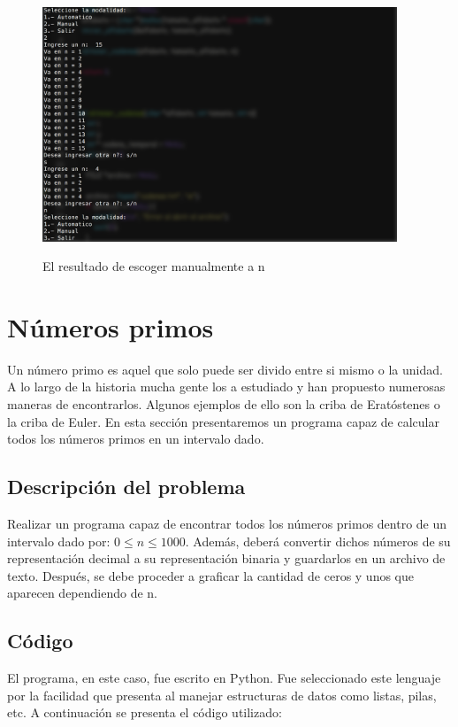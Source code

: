 \documentclass[12pt]{article}
\begin{document}
\begin{figure}[H]
\includegraphics[width=\textwidth, height=7cm]{alfabetos_manual}
\label{fig:manual_alfabeto}
\caption{El resultado de escoger manualmente a n}
\end{figure}


\newpage
\section{Números primos}
Un número primo es aquel que solo puede ser divido entre si mismo o la unidad. A lo largo de la historia mucha gente los a estudiado y han propuesto numerosas maneras de encontrarlos. Algunos ejemplos de ello son la criba de Eratóstenes o la criba de Euler. En esta sección presentaremos un programa capaz de calcular todos los números primos en un intervalo dado.

\subsection{Descripción del problema}
Realizar un programa capaz de encontrar todos los números primos dentro de un intervalo dado por: $0 \leq n \leq 1000$. Además, deberá convertir dichos números de su representación decimal a su representación binaria y guardarlos en un archivo de texto. Después, se debe proceder a graficar la cantidad de ceros y unos que aparecen dependiendo de n.

\subsection{Código}
El programa, en este caso, fue escrito en Python. Fue seleccionado este lenguaje por la facilidad que presenta al manejar estructuras de datos como listas, pilas, etc. A continuación se presenta el código utilizado:\\
\end{document}
